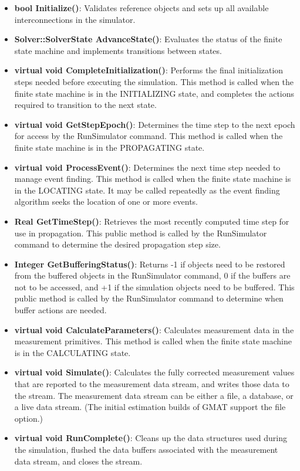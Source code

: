 \begin{itemize}
\item \textbf{bool Initialize()}:  Validates reference objects and sets up all available interconnections in the simulator.
\item \textbf{Solver::SolverState AdvanceState()}:  Evaluates the status of the finite state machine and implements transitions between states.
\item \textbf{virtual void CompleteInitialization()}:  Performs the final initialization steps needed before executing the simulation.  This method is called when the finite state machine is in the INITIALIZING state, and completes the actions required to transition to the next state.
\item \textbf{virtual void GetStepEpoch()}:  Determines the time step to the next epoch for access by the RunSimulator command. This method is called when the finite state machine is in the PROPAGATING state.
\item \textbf{virtual void ProcessEvent()}:  Determines the next time step needed to manage event finding. This method is called when the finite state machine is in the LOCATING state.  It may be called repeatedly as the event finding algorithm seeks the location of one or more events.
\item \textbf{Real GetTimeStep()}:  Retrieves the most recently computed time step for use in propagation. This public method is called by the RunSimulator command to determine the desired propagation step size.
\item \textbf{Integer GetBufferingStatus()}:  Returns -1 if objects need to be restored from the buffered objects in the RunSimulator command, 0 if the buffers are not to be accessed, and +1 if the simulation objects need to be buffered.  This public method is called by the RunSimulator command to determine when buffer actions are needed.
\item \textbf{virtual void CalculateParameters()}:  Calculates measurement data in the measurement primitives. This method is called when the finite state machine is in the CALCULATING state.
\item \textbf{virtual void Simulate()}:  Calculates the fully corrected measurement values that are reported to the measurement data stream, and writes those data to the stream.  The measurement data stream can be either a file, a database, or a live data stream.  (The initial estimation builds of GMAT support the file option.)
\item \textbf{virtual void RunComplete()}:  Cleans up the data structures used during the
simulation, flushed the data buffers associated with the measurement data stream, and closes the
stream.
\end{itemize}
